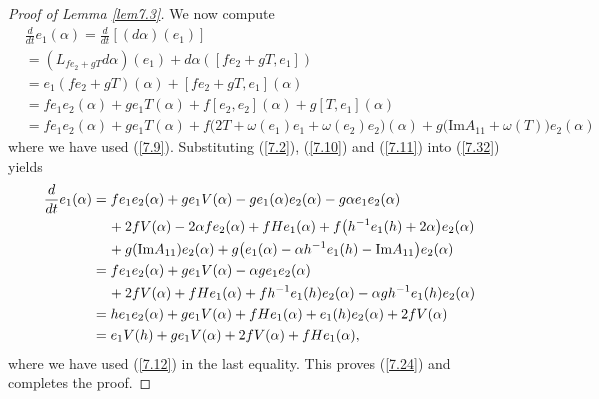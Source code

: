 \documentclass{amsart}
\theoremstyle{Corollary}
\numberwithin{equation}{section}
\begin{document}
\begin{proof}[Proof of Lemma \ref{lem7.3}]
We now compute 
\begin{equation}\label{7.32}
\begin{split}
&\frac{d}{dt}e_1(\alpha)=\frac{d}{dt}[(d\alpha)(e_1)]\\
&=(L_{fe_2+gT}d\alpha)(e_1)+d\alpha([fe_2+gT,e_1])\\
&=e_1(fe_2+gT)(\alpha)+[fe_2+gT,e_1](\alpha)\\
&=fe_1e_2(\alpha)+ge_1T(\alpha)+f[e_2,e_2](\alpha)+g[T,e_1](\alpha)\\
&=fe_1e_2(\alpha)+ge_1T(\alpha)+f\big(2T+\omega(e_1)e_1+\omega(e_2)e_2\big)(\alpha)
+g\big(\mbox{Im}A_{11}+\omega(T)\big)e_2(\alpha)
\end{split}
\end{equation}
where we have used (\ref{7.9}). Substituting (\ref{7.2}), 
(\ref{7.10})
and (\ref{7.11}) into (\ref{7.32}) yields
\begin{equation*} 
\begin{split}
\frac{d}{dt}e_1(\alpha)
&=fe_1e_2(\alpha)+ge_1V(\alpha)-ge_1(\alpha)e_2(\alpha)-g\alpha e_1e_2(\alpha)\\
&\hspace{4mm}+2fV(\alpha)-2\alpha fe_2(\alpha)+fHe_1(\alpha)
+f\big(h^{-1}e_1(h)+2\alpha\big)e_2(\alpha)\\
&\hspace{4mm}+g(\mbox{Im}A_{11})e_2(\alpha)+g\big(e_1(\alpha)-\alpha h^{-1}e_1(h)-\mbox{Im}A_{11}\big)e_2(\alpha)\\
&=fe_1e_2(\alpha)+ge_1 V(\alpha)-\alpha g e_1e_2(\alpha)\\
&\hspace{4mm}+2fV(\alpha)+fHe_1(\alpha)+fh^{-1}e_1(h)e_2(\alpha)-\alpha gh^{-1}e_1(h)e_2(\alpha)\\
&=he_1e_2(\alpha)+ge_1V(\alpha)+fHe_1(\alpha)+e_1(h)e_2(\alpha)+2fV(\alpha)\\
&=e_1V(h)+ge_1V(\alpha)+2fV(\alpha)+fHe_1(\alpha),
\end{split}
\end{equation*}
where we have used (\ref{7.12}) in the last equality. 
This proves (\ref{7.24})
and completes the proof. 
\end{proof}
\end{document}
